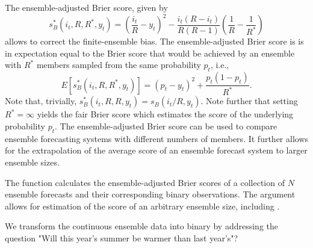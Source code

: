\documentclass[article]{jss}
\begin{document}
The ensemble-adjusted Brier score, given by \citep{ferro2008effect}
%
\begin{equation}
s_{B}^*(i_t, R, R^*, y_t) = \left(\frac{i_t}{R} - y_t\right)^2 - \frac{i_t(R-i_t)}{R(R-1)}\left(\frac{1}{R} - \frac{1}{R^*}\right)
\label{eq:ens-brier}
\end{equation}
%
allows to correct the finite-ensemble bias.
The ensemble-adjusted Brier score is is in expectation equal to the Brier score that would be achieved by an ensemble with $R^*$ members sampled from the same probability $p_t$, i.e., 
%
\begin{equation}
E\left[s_{B}^*(i_t, R, R^*, y_t)\right] = (p_t - y_t)^2 + \frac{p_t(1-p_t)}{R^*}.
\end{equation}
%
Note that, trivially, $s_{B}^*(i_t, R, R, y_t) = s_{B}(i_t/R, y_t)$.
Note further that setting $R^*=\infty$ yields the fair Brier score \citep{ferro2013fair} which estimates the score of the underlying probability $p_t$.
The ensemble-adjusted Brier score can be used to compare ensemble forecasting systems with different numbers of members.
It further allows for the extrapolation of the average score of an ensemble forecast system to larger ensemble sizes.


The  function  calculates the ensemble-adjusted Brier scores of a collection of $N$ ensemble forecasts and their corresponding binary observations. 
The argument  allows for estimation of the score of an arbitrary ensemble size, including .


We transform the continuous ensemble data into binary by addressing the question "Will this year's summer be warmer than last year's"?
\end{document}
